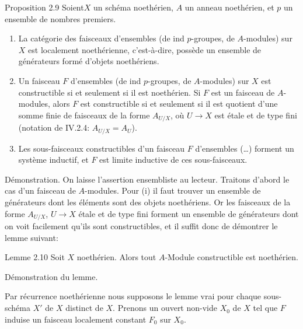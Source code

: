 \documentclass[10pt]{../fichiers-configuration-latex/smfart}
\begin{document}
\begin{enonce*}{Proposition 2.9}
Soient\pageoriginale $X$ un schéma noethérien, $A$ un anneau
noethérien, et $p$ un ensemble de nombres premiers.
\begin{enumerate}
\renewcommand{\theenumi}{\roman{enumi}}
\renewcommand{\labelenumi}{(\theenumi)}
\item La catégorie des faisceaux d'ensembles (\resp de ind
$p$-groupes, \resp de $A$-modules) sur $X$ est localement
noethérienne, c'est-à-dire, possède un ensemble de générateurs formé
d'objets noethériens.

\item Un faisceau $F$ d'ensembles (\resp de ind $p$-groupes, \resp de
$A$-modules) sur $X$ est constructible si et seulement si il est
noethérien. Si $F$ est un faisceau de $A$-modules, alors $F$ est
constructible si et seulement si il est quotient d'une somme finie de
faisceaux de la forme $A_{U/X}$, où $U\rightarrow X$ est étale et de
type fini (notation de {\rm IV.2.4}: $A_{U/X}=A_U$).


\item Les sous-faisceaux constructibles d'un faisceau $F$ d'ensembles
(\resp\ldots) forment un système inductif, et $F$ est limite inductive
de ces sous-faisceaux.
\end{enumerate}
\end{enonce*}

Démonstration. On laisse l'assertion ensembliste au lecteur. Traitons
d'abord le cas d'un faisceau de $A$-modules. Pour (i) il faut trouver
un ensemble de générateurs dont les éléments sont des objets
noethériens. Or les faisceaux de la forme $A_{U/X}$, $U\rightarrow X$
étale et de type fini forment un ensemble de générateurs dont on voit
facilement qu'ils sont constructibles, et il suffit donc de démontrer
le lemme suivant:

\begin{enonce*}{Lemme 2.10}
Soit $X$ noethérien. Alors tout $A$-Module constructible est noethérien.
\end{enonce*}

Démonstration du lemme.

Par récurrence noethérienne nous supposons le lemme vrai pour chaque
sous-schéma $X'$ de $X$ distinct de $X$. Prenons un ouvert non-vide
$X_0$ de $X$ tel que $F$ induise un faisceau localement constant $F_0$
sur $X_0$.
\end{document}
